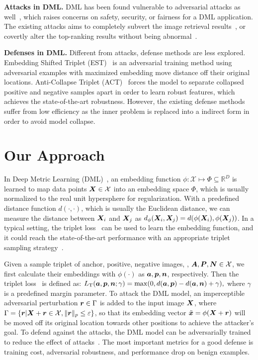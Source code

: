 \documentclass[10pt,twocolumn,letterpaper]{article}
\begin{document}
\textbf{Attacks in DML.}
%
DML has been found vulnerable to adversarial attacks as
well~\cite{advrank,advorder,robrank}, which raises concerns on safety,
security, or fairness for a DML application.
%
The existing attacks aims to completely subvert the image retrieval
results~\cite{qair,learn-to-misrank,advdpqn,advpattern,flowertower,universalret},
or covertly alter the top-ranking results without being
abnormal~\cite{advrank,advorder}.

%
\textbf{Defenses in DML.} Different from attacks, defense methods are less
explored.
%
Embedding Shifted Triplet (EST)~\cite{advrank} is an
adversarial training method using adversarial examples with maximized embedding
move distance off their original locations.
%
Anti-Collapse Triplet (ACT)~\cite{robrank} forces the model to separate
collapsed positive and negative samples apart in order to learn robust
features, which achieves the state-of-the-art robustness.
%
However, the existing defense methods suffer from low efficiency as the
inner problem is replaced into a indirect form in order to avoid model collapse.

\section{Our Approach}
\label{sec:3}


In Deep Metric Learning (DML)~\cite{revisiting,dmlreality}, an embedding
function $\phi:\mathcal{X}\mapsto \Phi \subseteq \mathbb{R}^D$ is learned to
map data points ${\bm{X}}\in\mathcal{X}$ into an embedding space $\Phi$, which is usually
normalized to the real unit hypersphere for regularization.
%
With a predefined distance function $d(\cdot,\cdot)$, which is usually the
Euclidean distance, we can measure the distance between ${\bm{X}}_i$ and ${\bm{X}}_j$ as
$d_\phi({\bm{X}}_i,{\bm{X}}_j)=d(\phi({\bm{X}}_i),\phi({\bm{X}}_j))$.
%
In a typical setting, the triplet loss~\cite{facenet} can be used to learn the
embedding function, and it could reach the state-of-the-art performance with an
appropriate triplet sampling strategy~\cite{revisiting}.


Given a sample triplet of anchor, positive, negative images, \ie, ${\bm{A}}, {\bm{P}},
{\bm{N}} \in \mathcal{X}$, we first calculate their embeddings with $\phi(\cdot)$ as
${\bm{a}}, {\bm{p}}, {\bm{n}}$, respectively.
%
Then the triplet loss~\cite{facenet} is defined as:
%
$
%
	L_\text{T}(\va, \vp, \vn; \gamma) = \max(0, d(\va, \vp) - d(\va, \vn) +
	\gamma),
%
$
%
where $\gamma$ is a predefined margin parameter.
%
To attack the DML model, an imperceptible adversarial perturbation ${\bm{r}} \in
\Gamma$ is added to the input image ${\bm{X}}$, where $\Gamma = \{{\bm{r}} | {\bm{X}}+{\bm{r}}\in
\mathcal{X},  \|{\bm{r}}\|_p \leq \varepsilon\}$, so that its embedding vector
$\tilde{{\bm{x}}}=\phi({\bm{X}}+{\bm{r}})$ will be moved off its original location towards
other positions to achieve the attacker's goal.
%
To defend against the attacks, the DML model can be adversarially trained to
reduce the effect of attacks~\cite{advrank,robrank}.
%
The most important metrics for a good defense is training cost, adversarial
robustness, and performance drop on benign examples.
\end{document}
